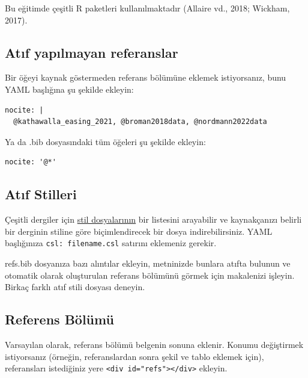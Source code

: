 \documentclass[
  oneside]{book}
\begin{document}
Bu eğitimde çeşitli R paketleri kullanılmaktadır (Allaire vd., 2018; Wickham, 2017).

\hypertarget{atux131f-yapux131lmayan-referanslar}{%
\subsection{Atıf yapılmayan referanslar}\label{atux131f-yapux131lmayan-referanslar}}

Bir öğeyi kaynak göstermeden referans bölümüne eklemek istiyorsanız, bunu YAML başlığına şu şekilde ekleyin:

\begin{verbatim}
nocite: |
  @kathawalla_easing_2021, @broman2018data, @nordmann2022data
\end{verbatim}

Ya da .bib dosyasındaki tüm öğeleri şu şekilde ekleyin:

\begin{verbatim}
nocite: '@*'
\end{verbatim}

\hypertarget{atux131f-stilleri}{%
\subsection{Atıf Stilleri}\label{atux131f-stilleri}}

Çeşitli dergiler için \href{https://www.zotero.org/styles}{stil dosyalarının} bir listesini arayabilir ve kaynakçanızı belirli bir derginin stiline göre biçimlendirecek bir dosya indirebilirsiniz. YAML başlığınıza \texttt{csl:\ filename.csl} satırını eklemeniz gerekir.

\begin{try}
refs.bib dosyanıza bazı alıntılar ekleyin, metninizde bunlara atıfta bulunun ve otomatik olarak oluşturulan referans bölümünü görmek için makalenizi işleyin. Birkaç farklı atıf stili dosyası deneyin.

\end{try}

\hypertarget{referens-buxf6luxfcmuxfc}{%
\subsection{Referens Bölümü}\label{referens-buxf6luxfcmuxfc}}

Varsayılan olarak, referans bölümü belgenin sonuna eklenir. Konumu değiştirmek istiyorsanız (örneğin, referanslardan sonra şekil ve tablo eklemek için), referansları istediğiniz yere \texttt{\textless{}div\ id="refs"\textgreater{}\textless{}/div\textgreater{}} ekleyin.
\end{document}
